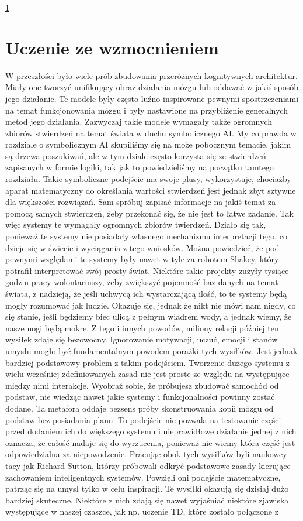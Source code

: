 \ref{chap:reinforcement}%
\chapter{Uczenie ze wzmocnieniem}
\label{chap:reinforcement}

W przeszłości było wiele prób zbudowania przeróżnych kognitywnych architektur. Miały one tworzyć unifikujący obraz działania mózgu lub oddawać w jakiś sposób jego działanie. Te modele były często luźno inspirowane pewnymi spostrzeżeniami na temat funkcjonowania mózgu i były nastawione na przybliżenie generalnych metod jego działania. Zazwyczaj takie modele wymagały także ogromnych zbiorów stwierdzeń na temat świata w duchu symbolicznego AI. My co prawda w rozdziale o symbolicznym AI skupiliśmy się na może pobocznym temacie, jakim są drzewa poszukiwań, ale w tym dziale często korzysta się ze stwierdzeń zapisanych w formie logiki, tak jak to powiedzieliśmy na początku tamtego rozdziału. Takie symboliczne podejście ma swoje plusy, wykorzystuje, chociażby aparat matematyczny do określania wartości stwierdzeń jest jednak zbyt sztywne dla większości rozwiązań. Sam spróbuj zapisać informacje na jakiś temat za pomocą samych stwierdzeń, żeby przekonać się, że nie jest to łatwe zadanie. Tak więc systemy te wymagały ogromnych zbiorów twierdzeń. Działo się tak, ponieważ te systemy nie posiadały własnego mechanizmu interpretacji tego, co dzieje się w świecie i wyciągania z tego wniosków. Można powiedzieć, że pod pewnymi względami te systemy były nawet w tyle za robotem Shakey, który potrafił interpretować swój prosty świat. Niektóre takie projekty zużyły tysiące godzin pracy wolontariuszy, żeby zwiększyć pojemność baz danych na temat świata, z nadzieją, że jeśli uchwycą ich wystarczającą ilość, to te systemy będą mogły rozumować jak ludzie. Okazuje się, jednak że nikt nie mówi nam nigdy, co się stanie, jeśli będziemy biec ulicą z pełnym wiadrem wody, a jednak wiemy, że nasze nogi będą mokre. Z tego i innych powodów, miliony relacji później ten wysiłek zdaje się bezowocny. Ignorowanie motywacji, uczuć, emocji i stanów umysłu mogło być fundamentalnym powodem porażki tych wysiłków. Jest jednak bardziej podstawowy problem z takim podejściem. Tworzenie dużego systemu z wielu wcześniej zdefiniowanych zasad nie jest proste ze względu na występujące między nimi interakcje. Wyobraź sobie, że próbujesz zbudować samochód od podstaw, nie wiedząc nawet jakie systemy i funkcjonalności powinny zostać dodane. Ta metafora oddaje bezsens próby skonstruowania kopii mózgu od podstaw bez posiadania planu. To podejście nie pozwala na testowanie części przed dodaniem ich do większego systemu i nieprawidłowe działanie jednej z nich oznacza, że całość nadaje się do wyrzucenia, ponieważ nie wiemy która część jest odpowiedzialna za niepowodzenie. Pracując obok tych wysiłków byli naukowcy tacy jak Richard Sutton, którzy próbowali odkryć podstawowe zasady kierujące zachowaniem inteligentnych systemów. Powzięli oni podejście matematyczne, patrząc się na umysł tylko w celu inspiracji. Te wysiłki okazują się dzisiaj dużo bardziej skuteczne. Niektóre z nich zdają się nawet wyjaśniać niektóre zjawiska występujące w naszej czaszce, jak np. uczenie TD, które zostało połączone z 